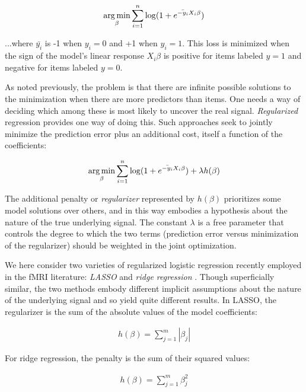 \begin{align}
\operatorname*{arg\,min}_\beta \sum^{n}_{i=1}{\log(1 + e^{\bar{-y_i} X_i\beta})}
\label{eq.logisticopt}
\end{align}

...where $\bar{y_i}$ is -1 when $y_i=0$ and +1 when $y_i=1$. This loss is minimized when the sign of the model's linear response $X_i\beta$ is positive for items labeled $y=1$ and negative for items labeled $y=0$.

As noted previously, the problem is that there are infinite possible solutions to the minimization when there are more predictors than items. One needs a way of deciding which among these is most likely to uncover the real signal. {\em Regularized} regression provides one way of doing this. Such approaches seek to jointly minimize the prediction error plus an additional cost, itself a function of the coefficients:

\begin{align}
\operatorname*{arg\,min}_\beta \sum^{n}_{i=1}{\log(1 + e^{\bar{-y_i} X_i\beta})} + \lambda h(\beta)
\label{eq.regularized}
\end{align}

The additional penalty or {\em regularizer} represented by $h(\beta)$ prioritizes some model solutions over others, and in this way embodies a hypothesis about the nature of the true underlying signal. The constant $\lambda$ is a free parameter that controls the degree to which the two terms (prediction error versus minimization of the regularizer) should be weighted in the joint optimization.

We here consider two varieties of regularized logistic regression recently employed in the fMRI literature: {\em LASSO}\cite{rish_sparse_2012} and {\em ridge regression} \cite{riggall_relationship_2012}. Though superficially similar, the two methods embody different implicit assumptions about the nature of the underlying signal and so yield quite different results. In LASSO, the regularizer is the sum of the absolute values of the model coefficients:

\begin{align}
h(\beta) = \sum^m_{j=1} |\beta_j|
\label{eq.lasso}
\end{align}

For ridge regression, the penalty is the sum of their squared values:

\begin{align}
h(\beta) = \sum^m_{j=1}\beta_j^2
\label{eq.ridge}
\end{align}

